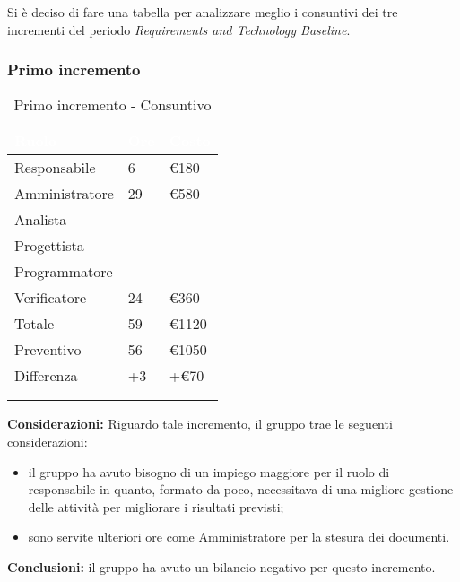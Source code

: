  { 
     Si è deciso di fare una tabella per analizzare meglio i consuntivi dei tre incrementi del periodo \textit{Requirements and Technology Baseline}.

\subsubsection{Primo incremento} 
{
      \setlength{\freewidth}{\dimexpr\textwidth-30\tabcolsep}
      \renewcommand{\arraystretch}{1.0}
      \centering
      \setlength{\aboverulesep}{0pt}
      \setlength{\belowrulesep}{0pt}
      \begin{longtable}{C{.4\freewidth} C{.2\freewidth} C{.2\freewidth}}
      \toprule
      \textcolor{white}{\textbf{Ruolo}}&
      \textcolor{white}{\textbf{Ore}}&
      \textcolor{white}{\textbf{Costo}}\\
      \toprule
      \endhead

      Responsabile & 6 & €180 \\
      Amministratore & 29 & €580 \\
      Analista & - & - \\
      Progettista & - & - \\
      Programmatore & - & - \\
      Verificatore & 24 & €360 \\
      Totale & 59 & €1120 \\
      Preventivo & 56 & €1050 \\
      Differenza & +3 & +€70 \\
      \bottomrule
      \\
      \caption{Primo incremento - Consuntivo}
      \end{longtable} 

      
      \textbf{Considerazioni:} 
        Riguardo tale incremento, il gruppo trae le seguenti considerazioni:
        \begin{itemize}
            \item il gruppo ha avuto bisogno di un impiego maggiore per il ruolo di responsabile in quanto, formato da poco, necessitava di una migliore gestione delle attività per migliorare i risultati previsti;
            \item sono servite ulteriori ore come Amministratore per la stesura dei documenti.
        \end{itemize}

        \textbf{Conclusioni:} il gruppo ha avuto un bilancio negativo per questo incremento. 
    }

}
